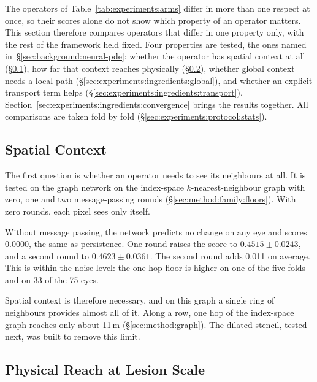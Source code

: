 The operators of Table~\ref{tab:experiments:arms} differ in more than one
respect at once, so their scores alone do not show which property of an
operator matters. This section therefore compares operators that differ in
one property only, with the rest of the framework held fixed. Four
properties are tested, the ones named in~\S\ref{sec:background:neural-pde}:
whether the operator has spatial context at all
(\S\ref{sec:experiments:ingredients:context}), how far that context
reaches physically (\S\ref{sec:experiments:ingredients:reach}), whether
global context needs a local path
(\S\ref{sec:experiments:ingredients:global}), and whether an explicit
transport term helps (\S\ref{sec:experiments:ingredients:transport}).
Section~\ref{sec:experiments:ingredients:convergence} brings the results
together. All comparisons are taken fold by fold
(\S\ref{sec:experiments:protocol:stats}).

\subsection{Spatial Context}
\label{sec:experiments:ingredients:context}

The first question is whether an operator needs to see its neighbours at
all. It is tested on the graph network on the index-space
$k$-nearest-neighbour graph with zero, one and two message-passing rounds
(\S\ref{sec:method:family:floors}). With zero rounds, each pixel sees only
itself.

Without message passing, the network predicts no change on any eye and
scores 0.0000, the same as persistence. One round raises the score to
$0.4515 \pm 0.0243$, and a second round to $0.4623 \pm 0.0361$. The second
round adds 0.011 on average. This is within the noise level: the one-hop
floor is higher on one of the five folds and on 33 of the 75 eyes.

Spatial context is therefore necessary, and on this graph a single ring of
neighbours provides almost all of it. Along a row, one hop of the
index-space graph reaches only about 11\,\textmu{}m
(\S\ref{sec:method:graph}). The dilated stencil, tested next, was built to
remove this limit.

\subsection{Physical Reach at Lesion Scale}
\label{sec:experiments:ingredients:reach}

